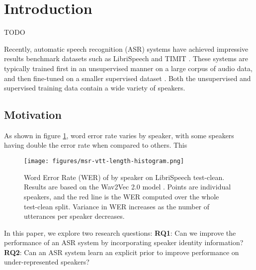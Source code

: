 \section{Introduction}

TODO

Recently, automatic speech recognition (ASR) systems have achieved impressive results benchmark datasets such as LibriSpeech \cite{librispeech} and TIMIT \cite{timit}.
These systems are typically trained first in an unsupervised manner on a large corpus of audio data, and then fine-tuned on a smaller supervised dataset \cite{wav2vec2, TODO}.
Both the unsupervised and supervised training data contain a wide variety of speakers.
\subsection{Motivation}

As shown in figure \ref{fig:by_speaker}, word error rate varies by speaker, with some speakers having double the error rate when compared to others.
This 

\begin{figure}[h]
      \centering
      \texttt{[image: figures/msr-vtt-length-histogram.png]}
      \caption{
          Word Error Rate (WER) of by speaker on LibriSpeech test-clean. 
          Results are based on the Wav2Vec 2.0 model \cite{wav2vec2}.
          Points are individual speakers, and the red line is the WER computed over the whole test-clean split.
          Variance in WER increases as the number of utterances per speaker decreases.
  }
      \label{fig:by_speaker}
\end{figure}

In this paper, we explore two research questions:
\textbf{RQ1}: Can we improve the performance of an ASR system by incorporating speaker identity information?
\textbf{RQ2}: Can an ASR system learn an explicit prior to improve performance on under-represented speakers?

